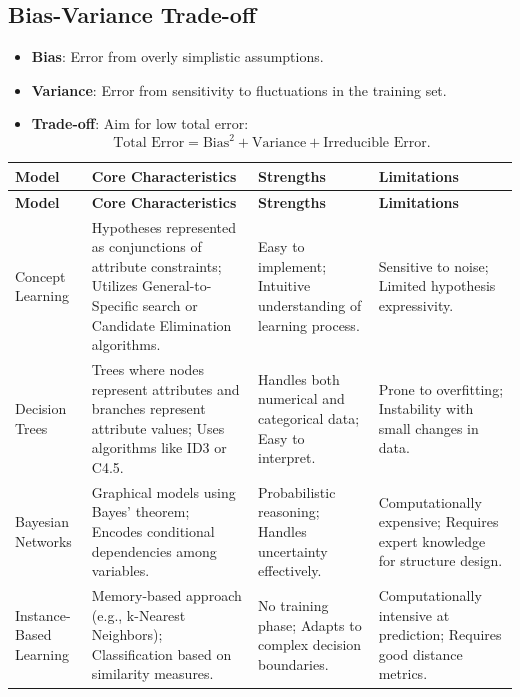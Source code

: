 \documentclass[10pt,a4paper]{article}
\begin{document}
\subsection*{Bias-Variance Trade-off}
\begin{itemize}
    \item \textbf{Bias}: Error from overly simplistic assumptions.
    \item \textbf{Variance}: Error from sensitivity to fluctuations in the training set.
    \item \textbf{Trade-off}: Aim for low total error:
    \[
    \text{Total Error} = \text{Bias}^2 + \text{Variance} + \text{Irreducible Error}.
    \]
\end{itemize}
\begin{longtable}{|p{3cm}|p{5cm}|p{5cm}|p{3cm}|}
\hline
\textbf{Model} & \textbf{Core Characteristics} & \textbf{Strengths} & \textbf{Limitations} \\
\hline
\endfirsthead
\hline
\textbf{Model} & \textbf{Core Characteristics} & \textbf{Strengths} & \textbf{Limitations} \\
\hline
\endhead
\hline
\endfoot
\hline
\endlastfoot

Concept Learning & Hypotheses represented as conjunctions of attribute constraints; Utilizes General-to-Specific search or Candidate Elimination algorithms. & Easy to implement; Intuitive understanding of learning process. & Sensitive to noise; Limited hypothesis expressivity. \\
\hline

Decision Trees & Trees where nodes represent attributes and branches represent attribute values; Uses algorithms like ID3 or C4.5. & Handles both numerical and categorical data; Easy to interpret. & Prone to overfitting; Instability with small changes in data. \\
\hline

Bayesian Networks & Graphical models using Bayes' theorem; Encodes conditional dependencies among variables. & Probabilistic reasoning; Handles uncertainty effectively. & Computationally expensive; Requires expert knowledge for structure design. \\
\hline

Instance-Based Learning & Memory-based approach (e.g., k-Nearest Neighbors); Classification based on similarity measures. & No training phase; Adapts to complex decision boundaries. & Computationally intensive at prediction; Requires good distance metrics. \\
\hline


\end{longtable}
\end{document}
